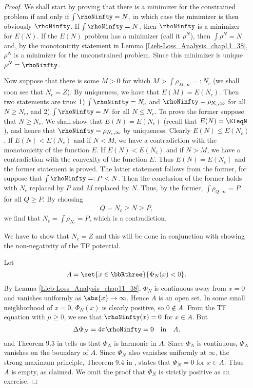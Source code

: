 \documentclass[openany, a4paper, oneside]{jsbook}
\begin{document}
\begin{proof}
We shall start by proving that there is a minimizer for the constrained problem if and only if $\int \rhoNinfty = N$,
in which case the minimizer is then obviously $\rhoNinfty$.
If $\int \rhoNinfty = N$, then $\rhoNinfty$ is a minimizer for $E (N)$.
If the $E (N)$ problem has a minimizer (call it $\rho^N$), then $\int \rho^N = N$ and,
by the monotonicity statement in Lemma \ref{Lieb-Loss_Analysis_chap11_38}, $\rho^N$ is a minimizer for the unconstrained problem.
Since this minimizer is unique $\rho^N = \rhoNinfty$.

Now suppose that there is some $M > 0$ for which $M > \int \rho_{M, \infty} =: N_c$
(we shall soon see that $N_c = Z$).
By uniqueness, we have that $E (M) = E (N_c)$.
Then two statements are true:
1) $\int \rhoNinfty = N_c$ and $\rhoNinfty = \rho_{N_c, \infty}$ for all $N \geq N_c$, and
2) $\int \rhoNinfty = N$ for all $N \leq N_c$.
To prove the former suppose that $N \geq N_c$.
We shall show that $E (N) = E (N_c)$ (recall that $E (N) = \EleqN$),
and hence that $\rhoNinfty = \rho_{N_c, \infty}$ by uniqueness.
Clearly $E (N) \leq E (N_c)$.
If $E (N) < E (N_c)$ and if $N<M$, we have a contradiction with the monotonicity of the function $E$.
If $E (N) < E (N_c)$ and if $N > M$, we have a contradiction with the convexity of the function $E$.
Thus $E (N) = E (N_c)$ and the former statement is proved.
The latter statement follows from the former,
for suppose that $\int \rhoNinfty =: P < N$.
Then the conclusion of the former holds with $N_c$ replaced by $P$ and $M$ replaced by $N$.
Thus, by the former, $\int \rho_{Q, \infty} = P$ for all $Q \geq P$.
By choosing
\begin{align}
 Q = N_c \geq N \geq P,
\end{align}
we find that $N_c = \int \rho_{N_c} = P$, which is a contradiction.

We have to show that $N_c = Z$ and this will be done in conjunction with showing the non-negativity of the TF potential.

Let
\begin{align}
 A
 =
 \set{x \in \bbRthree}{\Phi_N (x) < 0}.
\end{align}
By Lemma \ref{Lieb-Loss_Analysis_chap11_38},
$\Phi_N$ is continuous away from $x=0$ and vanishes uniformly as $\abs{x} \to \infty$.
Hence $A$ is an open set.
In some small neighborhood of $x=0$, $\Phi_N (x)$ is clearly positive, so $0 \notin A$.
From the TF equation with $\mu \geq 0$,
we see that $\rhoNinfty (x) = 0$ for $x \in A$.
But
\begin{align}
 \Delta \Phi_N = 4 \pi \rhoNinfty = 0 \quad \text{in}  \quad A,
\end{align}
and Theorem 9.3 in \cite{LiebLoss1} tells us that $\Phi_N$ is harmonic in $A$.
Since $\Phi_N$ is continuous, $\Phi_N$ vanishes on the boundary of $A$.
Since $\Phi_N$ also vanishes uniformly at $\infty$, the strong maximum principle, Theorem 9.4 in \cite{LiebLoss1},
states that $\Phi_N = 0$ for $x \in A$.
Thus $A$ is empty, as claimed.
We omit the proof that $\Phi_N$ is strictly positive as an exercise.


\end{proof}
\end{document}
